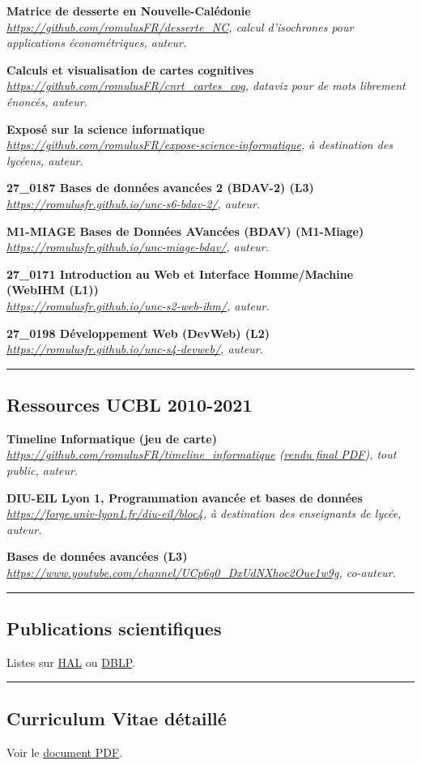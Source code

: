 \documentclass[12pt,a4paper]{article}
\newcommand{\hr}{\textcolor{gris80}{\rule{\linewidth}{0.5pt}}}
\newcommand{\activite}[1]{\textbf{#1}\xspace}
\newcommand{\comment}[1]{\textsl{#1}\xspace}
\begin{document}
\activite{Matrice de desserte en Nouvelle-Calédonie}\\
\comment{\url{https://github.com/romulusFR/desserte_NC}, calcul d'isochrones pour applications économétriques, auteur.}

\activite{Calculs et visualisation de cartes cognitives}\\
\comment{\url{https://github.com/romulusFR/cnrt_cartes_cog}, \emph{dataviz} pour de mots librement énoncés, auteur.}

\activite{Exposé sur la science informatique}\\
\comment{\url{https://github.com/romulusFR/expose-science-informatique}, à destination des lycéens, auteur.}

\activite{27\_0187 Bases de données avancées 2 (BDAV-2) (L3)}\\
\comment{\url{https://romulusfr.github.io/unc-s6-bdav-2/}, auteur.}

\activite{M1-MIAGE Bases de Données AVancées (BDAV) (M1-Miage)}\\
\comment{\url{https://romulusfr.github.io/unc-miage-bdav/}, auteur.}

\activite{27\_0171 Introduction au Web et Interface Homme/Machine (WebIHM (L1))}\\
\comment{\url{https://romulusfr.github.io/unc-s2-web-ihm/}, auteur.}

\activite{27\_0198 Développement Web (DevWeb) (L2)}\\
\comment{\url{https://romulusfr.github.io/unc-s4-devweb/}, auteur.}

\hr
\subsection*{Ressources UCBL 2010-2021}

\activite{Timeline Informatique (jeu de carte)}\\
\comment{\url{https://github.com/romulusFR/timeline_informatique} (\href{https://perso.liris.cnrs.fr/romuald.thion/files/Communication/Timeline/nine_cards_by_page.pdf}{rendu final PDF}), tout public, auteur.}

\activite{DIU-EIL Lyon 1, Programmation avancée et bases de données}\\
\comment{\url{https://forge.univ-lyon1.fr/diu-eil/bloc4}, à destination des enseignants de lycée, auteur.}

\activite{Bases de données avancées (L3)}\\
\comment{\url{https://www.youtube.com/channel/UCp6q0_DxUdNXhoc2Oue1w9g}, co-auteur.}

\hr
\subsection*{Publications scientifiques}

Listes sur \href{https://cv.hal.science/romuald-thion}{HAL} ou \href{https://dblp.org/pid/89/6675.html}{DBLP}.

\hr
\subsection*{Curriculum Vitae détaillé}

Voir le \href{./CV_2024.pdf}{document PDF}.
\end{document}
